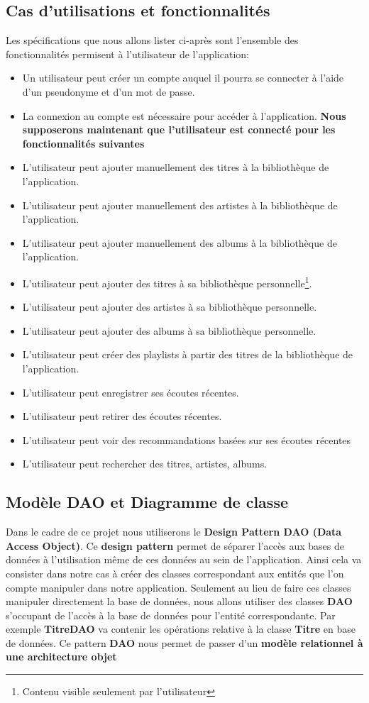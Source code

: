 \documentclass[a4paper,12pt, french]{report}
\begin{document}
  \subsection{Cas d'utilisations et fonctionnalités}
    Les spécifications que nous allons lister ci-après sont l'ensemble des fonctionnalités permisent à l'utilisateur de l'application:
    \begin{itemize}
      \item Un utilisateur peut créer un compte auquel il pourra se connecter à l'aide d'un pseudonyme et d'un mot de passe.
      \item La connexion au compte est nécessaire pour accéder à l'application. \newline
        \textbf{Nous supposerons maintenant que l'utilisateur est connecté pour les fonctionnalités suivantes}
      \item L'utilisateur peut ajouter manuellement des titres à la bibliothèque de l'application.
      \item L'utilisateur peut ajouter manuellement des artistes à la bibliothèque de l'application.
      \item L'utilisateur peut ajouter manuellement des albums à la bibliothèque de l'application.
      \item L'utilisateur peut ajouter des titres à sa bibliothèque personnelle\footnote{Contenu visible seulement par l'utilisateur}.
      \item L'utilisateur peut ajouter des artistes à sa bibliothèque personnelle.
      \item L'utilisateur peut ajouter des albums à sa bibliothèque personnelle.
      \item L'utilisateur peut créer des playlists à partir des titres de la bibliothèque de l'application.
      \item L'utilisateur peut enregistrer ses écoutes récentes.
      \item L'utilisateur peut retirer des écoutes récentes.
      \item L'utilisateur peut voir des recommandations basées sur ses écoutes récentes
      \item L'utilisateur peut rechercher des titres, artistes, albums.
    \end{itemize}
  \subsection{Modèle DAO et Diagramme de classe}
    Dans le cadre de ce projet nous utiliserons le \textbf{Design Pattern DAO (Data Access Object)}. Ce \textbf{design pattern} permet de séparer l'accès aux bases de données à l'utilisation même de ces données au sein de l'application. Ainsi cela va consister dans notre cas à créer des classes correspondant aux entités que l'on compte manipuler dans notre application. Seulement au lieu de faire ces classes manipuler directement la base de données, nous allons utiliser des classes \textbf{DAO} s'occupant de l'accès à la base de données pour l'entité correspondante. Par exemple \textbf{TitreDAO} va contenir les opérations relative à la classe \textbf{Titre} en base de données. Ce pattern \textbf{DAO} nous permet de passer d'un \textbf{modèle relationnel à une architecture objet}
\end{document}
